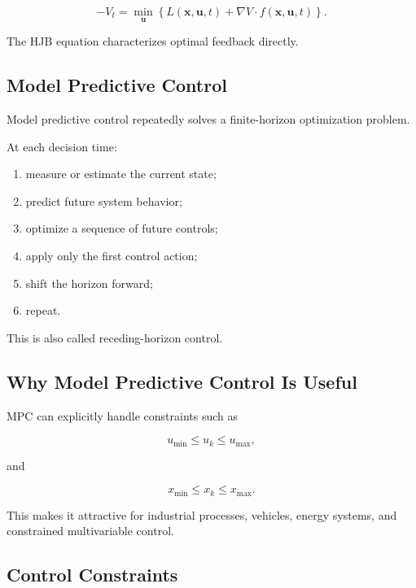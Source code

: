 \[
\boxed{
-V_t
=
\min_{\mathbf{u}}
\left\{
L(\mathbf{x},\mathbf{u},t)
+
\nabla V
\cdot
f(\mathbf{x},\mathbf{u},t)
\right\}.
}
\]

The HJB equation characterizes optimal feedback directly.

\subsection{Model Predictive Control}
\label{subsec:model-predictive-control}

Model predictive control repeatedly solves a finite-horizon optimization
problem.

At each decision time:

\begin{enumerate}
    \item measure or estimate the current state;
    \item predict future system behavior;
    \item optimize a sequence of future controls;
    \item apply only the first control action;
    \item shift the horizon forward;
    \item repeat.
\end{enumerate}

This is also called receding-horizon control.

\subsection{Why Model Predictive Control Is Useful}
\label{subsec:mpc-advantages}

MPC can explicitly handle constraints such as

\[
\boxed{
u_{\min}
\leq
u_k
\leq
u_{\max},
}
\]

and

\[
\boxed{
x_{\min}
\leq
x_k
\leq
x_{\max}.
}
\]

This makes it attractive for industrial processes, vehicles, energy systems,
and constrained multivariable control.

\subsection{Control Constraints}
\label{subsec:control-constraints}

